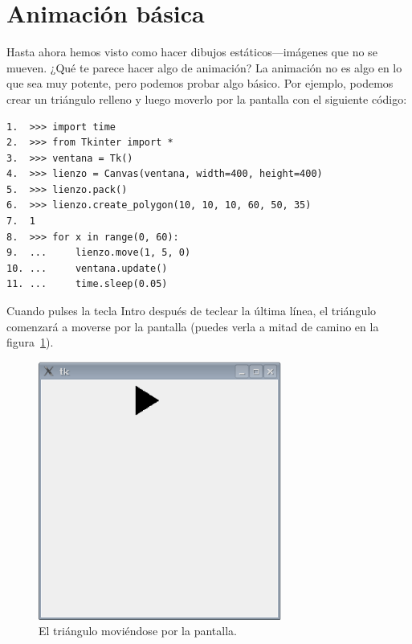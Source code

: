\section{Animación básica}

Hasta ahora hemos visto como hacer dibujos estáticos---imágenes que no se mueven.  ¿Qué te parece hacer algo de animación? La animación no es algo en lo que  sea muy potente, pero podemos probar algo básico.  Por ejemplo, podemos crear un triángulo relleno y luego moverlo por la pantalla con el siguiente código:

\begin{listingignore}
\begin{verbatim}
1.  >>> import time
2.  >>> from Tkinter import *
3.  >>> ventana = Tk()
4.  >>> lienzo = Canvas(ventana, width=400, height=400)
5.  >>> lienzo.pack()
6.  >>> lienzo.create_polygon(10, 10, 10, 60, 50, 35)
7.  1
8.  >>> for x in range(0, 60):
9.  ...     lienzo.move(1, 5, 0)
10. ...     ventana.update()
11. ...     time.sleep(0.05)
\end{verbatim}
\end{listingignore}

Cuando pulses la tecla Intro después de teclear la última línea, el triángulo comenzará a moverse por la pantalla (puedes verla a mitad de camino en la figura~\ref{fig44}).

\begin{figure}
\begin{center}
\includegraphics[width=80mm]{figure44.eps}
\end{center}
\caption{El triángulo moviéndose por la pantalla.}\label{fig44}
\end{figure}

